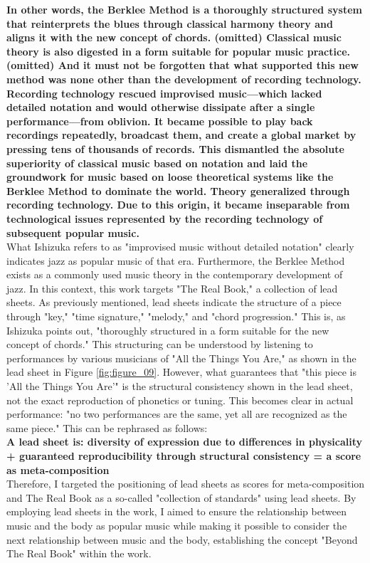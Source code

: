 {\bf In other words, the Berklee Method is a thoroughly structured system that reinterprets the blues through classical harmony theory and aligns it with the new concept of chords. (omitted) Classical music theory is also digested in a form suitable for popular music practice. (omitted) And it must not be forgotten that what supported this new method was none other than the development of recording technology. Recording technology rescued improvised music—which lacked detailed notation and would otherwise dissipate after a single performance—from oblivion. It became possible to play back recordings repeatedly, broadcast them, and create a global market by pressing tens of thousands of records. This dismantled the absolute superiority of classical music based on notation and laid the groundwork for music based on loose theoretical systems like the Berklee Method to dominate the world. Theory generalized through recording technology. Due to this origin, it became inseparable from technological issues represented by the recording technology of subsequent popular music.}\\

What Ishizuka refers to as "improvised music without detailed notation" clearly indicates jazz as popular music of that era. Furthermore, the Berklee Method exists as a commonly used music theory in the contemporary development of jazz. In this context, this work targets "The Real Book," a collection of lead sheets. As previously mentioned, lead sheets indicate the structure of a piece through "key," "time signature," "melody," and "chord progression." This is, as Ishizuka points out, "thoroughly structured in a form suitable for the new concept of chords." This structuring can be understood by listening to performances by various musicians of "All the Things You Are," as shown in the lead sheet in Figure \ref{fig:figure_09}. However, what guarantees that "this piece is 'All the Things You Are'" is the structural consistency shown in the lead sheet, not the exact reproduction of phonetics or tuning. This becomes clear in actual performance: "no two performances are the same, yet all are recognized as the same piece." This can be rephrased as follows:\\

{\bf A lead sheet is: diversity of expression due to differences in physicality + guaranteed reproducibility through structural consistency = a score as meta-composition}\\

Therefore, I targeted the positioning of lead sheets as scores for meta-composition and The Real Book as a so-called "collection of standards" using lead sheets. By employing lead sheets in the work, I aimed to ensure the relationship between music and the body as popular music while making it possible to consider the next relationship between music and the body, establishing the concept "Beyond The Real Book" within the work.

